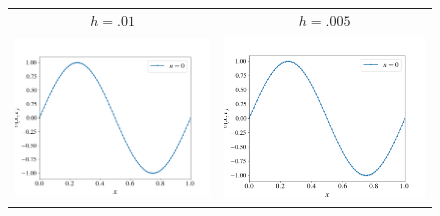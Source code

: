 \documentclass[12pt, reqno]{report}
\theoremstyle{definition}
\theoremstyle{remark}
\begin{document}
\begin{figure}[H]
    \begin{tabular}{cc}
        $h=.01$ & $h=.005$ \\
        \includegraphics[width = \acfdwidth]{media_paper/stable_AC_CN_0} &
        \includegraphics[width = \acfdwidth]{media_paper/stable_AC_CN_0} \\

\end{tabular}
\end{figure}
\end{document}
